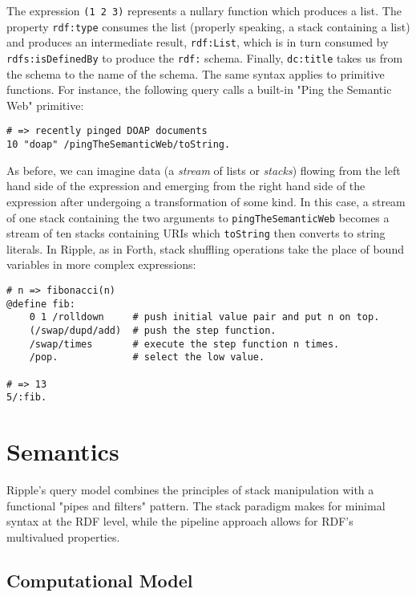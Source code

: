 \documentclass[runningheads]{llncs}
\begin{document}
The expression \texttt{(1 2 3)} represents a nullary function which produces a list.  The property \texttt{rdf:type}  consumes the list (properly speaking, a stack containing a list) and produces an intermediate result, \texttt{rdf:List}, which is in turn consumed by \texttt{rdfs:isDefinedBy} to produce the \texttt{rdf:} schema.  Finally, \texttt{dc:title} takes us from the schema to the name of the schema.
The same syntax applies to primitive functions.  For instance, the following query calls a built-in "Ping the Semantic Web" primitive:
\begin{verbatim}
# => recently pinged DOAP documents
10 "doap" /pingTheSemanticWeb/toString.
\end{verbatim}
As before, we can imagine data (a \textit{stream} of lists or \textit{stacks}) flowing from the left hand side of the expression and emerging from the right hand side of the expression after undergoing a transformation of some kind.  In this case, a stream of one stack containing the two arguments to \texttt{pingTheSemanticWeb} becomes a stream of ten stacks containing URIs which \texttt{toString} then converts to string literals.
In Ripple, as in Forth, stack shuffling operations take the place of bound variables in more complex expressions:
\begin{verbatim}
# n => fibonacci(n)
@define fib:
    0 1 /rolldown     # push initial value pair and put n on top.
    (/swap/dupd/add)  # push the step function.
    /swap/times       # execute the step function n times.
    /pop.             # select the low value.

# => 13
5/:fib.
\end{verbatim}










\section{Semantics}

Ripple's query model combines the principles of stack manipulation with a functional "pipes and filters" pattern.  The stack paradigm makes for minimal syntax at the RDF level, while the pipeline approach allows for RDF's multivalued properties.




\subsection{Computational Model}
\end{document}
